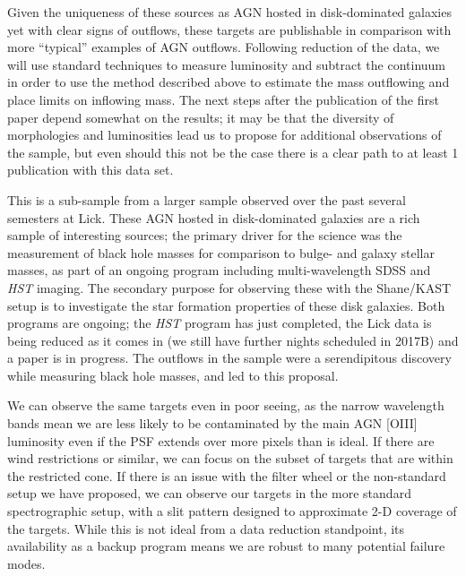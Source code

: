 \documentclass[12pt]{article}
\begin{document}
\vspace{0.25em}


\vspace{0.25em}
Given the uniqueness of these sources as AGN hosted in disk-dominated galaxies yet with clear signs of outflows, these targets are publishable in comparison with more ``typical'' examples of AGN outflows. Following reduction of the data, we will use standard techniques to measure luminosity and subtract the continuum in order to use the method described above to estimate the mass outflowing and place limits on inflowing mass. The next steps after the publication of the first paper depend somewhat on the results; it may be that the diversity of morphologies and luminosities lead us to propose for additional observations of the sample, but even should this not be the case there is a clear path to at least 1 publication with this data set.
\vspace{0.25em}


\vspace{0.25em}
This is a sub-sample from a larger sample observed over the past several semesters at Lick. These AGN hosted in disk-dominated galaxies are a rich sample of interesting sources; the primary driver for the science was the measurement of black hole masses for comparison to bulge- and galaxy stellar masses, as part of an ongoing program including multi-wavelength SDSS and \emph{HST} imaging. The secondary purpose for observing these with the Shane/KAST setup is to investigate the star formation properties of these disk galaxies. Both programs are ongoing; the \emph{HST} program has just completed, the Lick data is being reduced as it comes in (we still have further nights scheduled in 2017B) and a paper is in progress. The outflows in the sample were a serendipitous discovery while measuring black hole masses, and led to this proposal. 
\vspace{0.25em}


\vspace{0.25em}
We can observe the same targets even in poor seeing, as the narrow wavelength bands mean we are less likely to be contaminated by the main AGN [OIII] luminosity even if the PSF extends over more pixels than is ideal. If there are wind restrictions or similar, we can focus on the subset of targets that are within the restricted cone. If there is an issue with the filter wheel or the non-standard setup we have proposed, we can observe our targets in the more standard spectrographic setup, with a slit pattern designed to approximate 2-D coverage of the targets. While this is not ideal from a data reduction standpoint, its availability as a backup program means we are robust to many potential failure modes. 
\vspace{1.5em}
\end{document}
